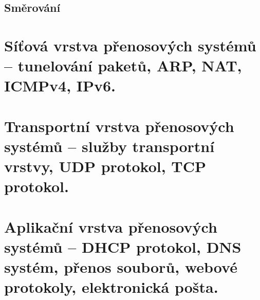 \subsection{Směrování}

\clearpage
\section{Síťová vrstva přenosových systémů -- tunelování paketů, ARP, NAT, ICMPv4, IPv6.}

\clearpage
\section{Transportní vrstva přenosových systémů -- služby transportní vrstvy, UDP protokol, TCP protokol.}

\clearpage
\section{Aplikační vrstva přenosových systémů -- DHCP protokol, DNS systém, přenos souborů, webové protokoly, elektronická pošta.}
